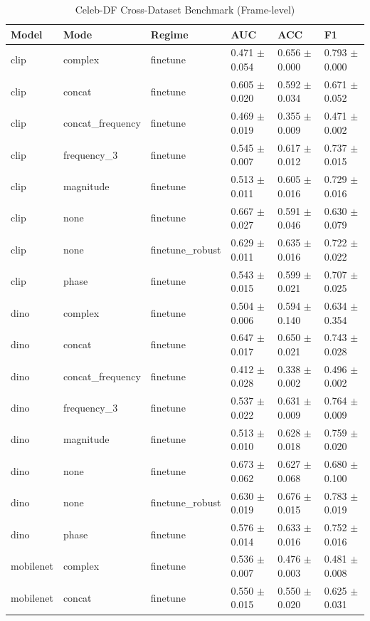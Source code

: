 \begin{table}
\caption{Celeb-DF Cross-Dataset Benchmark (Frame-level)}
\label{tab:celebdf_frame}
\begin{tabular}{llllll}
\toprule
Model & Mode & Regime & AUC & ACC & F1 \\
\midrule
clip & complex & finetune & 0.471 $\pm$ 0.054 & 0.656 $\pm$ 0.000 & 0.793 $\pm$ 0.000 \\
clip & concat & finetune & 0.605 $\pm$ 0.020 & 0.592 $\pm$ 0.034 & 0.671 $\pm$ 0.052 \\
clip & concat_frequency & finetune & 0.469 $\pm$ 0.019 & 0.355 $\pm$ 0.009 & 0.471 $\pm$ 0.002 \\
clip & frequency_3 & finetune & 0.545 $\pm$ 0.007 & 0.617 $\pm$ 0.012 & 0.737 $\pm$ 0.015 \\
clip & magnitude & finetune & 0.513 $\pm$ 0.011 & 0.605 $\pm$ 0.016 & 0.729 $\pm$ 0.016 \\
clip & none & finetune & 0.667 $\pm$ 0.027 & 0.591 $\pm$ 0.046 & 0.630 $\pm$ 0.079 \\
clip & none & finetune_robust & 0.629 $\pm$ 0.011 & 0.635 $\pm$ 0.016 & 0.722 $\pm$ 0.022 \\
clip & phase & finetune & 0.543 $\pm$ 0.015 & 0.599 $\pm$ 0.021 & 0.707 $\pm$ 0.025 \\
dino & complex & finetune & 0.504 $\pm$ 0.006 & 0.594 $\pm$ 0.140 & 0.634 $\pm$ 0.354 \\
dino & concat & finetune & 0.647 $\pm$ 0.017 & 0.650 $\pm$ 0.021 & 0.743 $\pm$ 0.028 \\
dino & concat_frequency & finetune & 0.412 $\pm$ 0.028 & 0.338 $\pm$ 0.002 & 0.496 $\pm$ 0.002 \\
dino & frequency_3 & finetune & 0.537 $\pm$ 0.022 & 0.631 $\pm$ 0.009 & 0.764 $\pm$ 0.009 \\
dino & magnitude & finetune & 0.513 $\pm$ 0.010 & 0.628 $\pm$ 0.018 & 0.759 $\pm$ 0.020 \\
dino & none & finetune & 0.673 $\pm$ 0.062 & 0.627 $\pm$ 0.068 & 0.680 $\pm$ 0.100 \\
dino & none & finetune_robust & 0.630 $\pm$ 0.019 & 0.676 $\pm$ 0.015 & 0.783 $\pm$ 0.019 \\
dino & phase & finetune & 0.576 $\pm$ 0.014 & 0.633 $\pm$ 0.016 & 0.752 $\pm$ 0.016 \\
mobilenet & complex & finetune & 0.536 $\pm$ 0.007 & 0.476 $\pm$ 0.003 & 0.481 $\pm$ 0.008 \\
mobilenet & concat & finetune & 0.550 $\pm$ 0.015 & 0.550 $\pm$ 0.020 & 0.625 $\pm$ 0.031 \\

\end{tabular}
\end{table}

